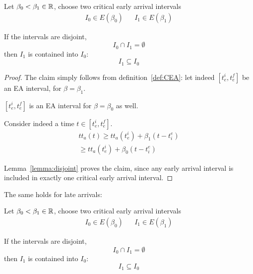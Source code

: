 \begin{lemma}
  \label{lemma:increasing-int}
  Let \(\beta_0 < \beta_1 \in \mathbb{R}\),
  choose two critical early arrival intervals 
  \begin{align*}
    I_0 \in E(\beta_0) && I_1 \in E(\beta_1)
  \end{align*}
  
  If the intervals are disjoint,
  \begin{equation*}
    I_0 \cap I_1 = \emptyset
  \end{equation*}
  then \(I_1\) is contained into \(I_0\):
  \begin{equation*}
    I_1 \subseteq I_0
  \end{equation*}
\end{lemma}
\begin{proof}
  The claim simply follows from definition~\ref{def:CEA}:
  let indeed \([t_e^i, t_e^f]\) be an EA interval,
  for \(\beta = \beta_1\).

  \([t_e^i, t_e^f]\) is an EA interval for \(\beta = \beta_0\) as well.

  Consider indeed a time \(t \in [t_e^i, t_e^f]\).
  \begin{equation*}
    \begin{split}
      tt_a(t) \geq tt_a(t_e^i) + \beta_1(t - t_i^e) \\
      \geq  tt_a(t_e^i) + \beta_0(t - t_i^e)
    \end{split}
  \end{equation*}

  Lemma~\ref{lemma:disjoint} proves the claim,
  since any early arrival interval is included in exactly one critical early arrival interval.
\end{proof}

The same holds for late arrivals:

\begin{lemma}
  \label{lemma:decreasing-int}
  Let \(\beta_0 < \beta_1 \in \mathbb{R}\),
  choose two critical early arrival intervals 
  \begin{align*}
    I_0 \in E(\beta_0) && I_1 \in E(\beta_1)
  \end{align*}
  
  If the intervals are disjoint,
  \begin{equation*}
    I_0 \cap I_1 = \emptyset
  \end{equation*}
  then \(I_1\) is contained into \(I_0\):
  \begin{equation*}
    I_1 \subseteq I_0
  \end{equation*}
\end{lemma}


